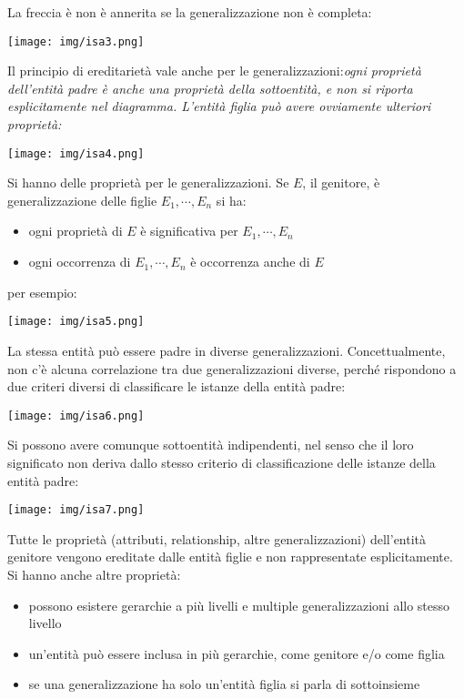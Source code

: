 \documentclass[a4paper,12pt, oneside]{book}
\begin{document}
La freccia è non è annerita se la generalizzazione non è
completa:
\begin{center}
\texttt{[image: img/isa3.png]}
\end{center}
Il principio di ereditarietà vale anche per le generalizzazioni:\textit{ogni proprietà dell'entità padre è anche una proprietà della sottoentità, e non si riporta esplicitamente nel diagramma. L'entità figlia può avere ovviamente ulteriori proprietà:}
\begin{center}
\texttt{[image: img/isa4.png]}
\end{center}
Si hanno delle proprietà per le generalizzazioni. Se $E$, il genitore, è generalizzazione delle figlie $E_1,\cdots, E_n$ si ha:
\begin{itemize}
\item ogni proprietà di $E$ è significativa per $E_1,\cdots, E_n$
\item ogni occorrenza di $E_1,\cdots, E_n$ è occorrenza anche di $E$ 
\end{itemize}
per esempio:
\begin{center}
\texttt{[image: img/isa5.png]}
\end{center}
La stessa entità può essere padre in diverse
generalizzazioni. Concettualmente, non c'è alcuna correlazione tra due generalizzazioni diverse, perché rispondono a due criteri diversi di classificare le istanze della entità padre:
\begin{center}
\texttt{[image: img/isa6.png]}
\end{center}
Si possono avere comunque sottoentità indipendenti, nel senso che il loro significato non deriva dallo stesso
criterio di classificazione delle istanze della entità padre:
\begin{center}
\texttt{[image: img/isa7.png]}
\end{center}
Tutte le proprietà (attributi, relationship,
altre generalizzazioni) dell'entità genitore
vengono ereditate dalle entità figlie e non
rappresentate esplicitamente.\\
Si hanno anche altre proprietà:
\begin{itemize}
\item possono esistere gerarchie a più livelli e
multiple generalizzazioni allo stesso livello
\item un'entità può essere inclusa in più gerarchie,
come genitore e/o come figlia
\item se una generalizzazione ha solo un'entità figlia
si parla di sottoinsieme
\end{itemize}
\end{document}
